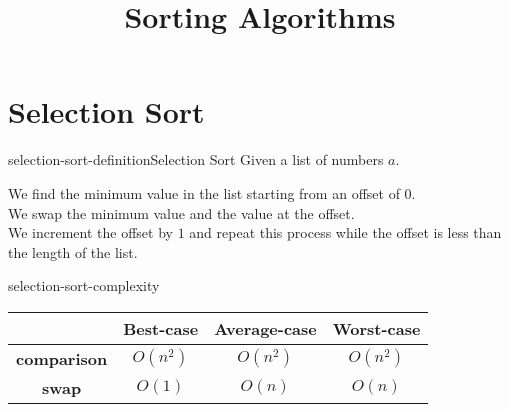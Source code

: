 \documentclass[preview]{standalone}
\begin{document}
\title{Sorting Algorithms}
\genpage

\section{Selection Sort}

\begin{snippetdefinition}{selection-sort-definition}{Selection Sort}
    Given a list of numbers \(a\).

    We find the minimum value in the list starting from an offset of \(0\).\\
    We swap the minimum value and the value at the offset.\\
    We increment the offset by \(1\) and repeat this process while the offset is less than the length of the list.
\end{snippetdefinition}

\begin{snippet}{selection-sort-complexity}
    \def\arraystretch{1.5}
    \begin{center}
        \begin{tabular}{ |c|c|c|c| }
            \hline
            & \textbf{Best-case} & \textbf{Average-case} &\textbf{Worst-case} \\
            \hline
            \textbf{comparison} & \(O(n^2)\) & \(O(n^2)\) & \(O(n^2)\) \\ 
            \hline
            \textbf{swap} & \(O(1)\) & \(O(n)\) & \(O(n)\) \\ 
            \hline
        \end{tabular}
    \end{center}
    \vspace{0.5cm}
\end{snippet}

\end{document}
